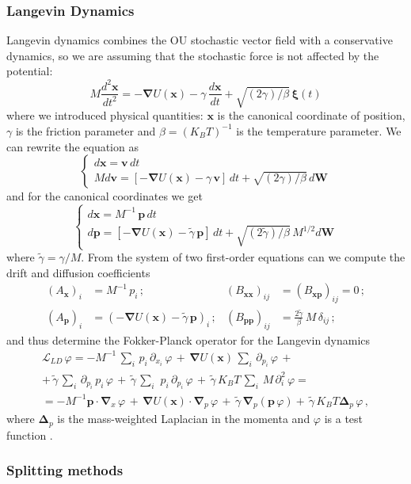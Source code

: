 \documentclass[10pt,a4paper]{article}
\begin{document}
\subsubsection{Langevin Dynamics}
Langevin dynamics combines the OU stochastic vector field with a conservative dynamics, so we are assuming that the stochastic force is not affected by the potential:
\[
 M\frac{d^2\mathbf{x}}{dt^2}=-\boldsymbol{\nabla} U(\mathbf{x})-\gamma\,\frac{d\mathbf{x}}{dt}+\sqrt{(2\gamma)/\beta}\,\boldsymbol{\xi}(t)
\]
where we introduced physical quantities: $\mathbf{x}$ is the canonical coordinate of position, $\gamma$ is the friction parameter and $\beta=\left( K_BT \right)^{-1}$ is the temperature parameter. We can rewrite the equation as
\[
\begin{cases}
 d\mathbf{x}=\mathbf{v}\,dt \\
 Md\mathbf{v}=\left[ -\boldsymbol{\nabla} U(\mathbf{x})-\gamma\,\mathbf{v} \right]\,dt+\sqrt{(2\gamma)/\beta}\,d\mathbf{W}
\end{cases}
\]
and for the canonical coordinates we get 
\[
\begin{cases}
 d\mathbf{x}=M^{-1}\,\mathbf{p}\,dt \\
 d\mathbf{p}=\left[ -\boldsymbol{\nabla} U(\mathbf{x})-\tilde{\gamma}\,\mathbf{p} \right]\,dt+\sqrt{(2\tilde{\gamma})/\beta}\,M^{1/2}d\mathbf{W}
\end{cases}
\]
where $\tilde{\gamma}=\gamma/M$. From the system of two first-order equations can we compute the drift and diffusion coefficients
\begin{align*}
 \left(A_{\mathbf{x}}\right)_i &= M^{-1}\,p_i\,;  &  \left(B_{\mathbf{x}\mathbf{x}}\right)_{ij} &= \left(B_{\mathbf{x}\mathbf{p}}\right)_{ij}=0\,; \\
 \left(A_{\mathbf{p}}\right)_i &= \left(-\boldsymbol{\nabla} U(\mathbf{x})-\tilde{\gamma}\,\mathbf{p}\right)_i\,;  &  
      \left(B_{\mathbf{p}\mathbf{p}}\right)_{ij} &= \frac{2\tilde{\gamma}}{\beta}\,M\,\delta_{ij}\,;
\end{align*}
and thus determine the Fokker-Planck operator for the Langevin dynamics
\begin{multline*}
 \mathscr{L}_{LD}\,\varphi=-M^{-1}\,\sum_i\,p_i\,\partial_{x_i}\,\varphi\,+ 
                          \,\boldsymbol{\nabla}U(\mathbf{x})\,\sum_i\,\partial_{p_i}\,\varphi\,+{}\\
                          +\,\tilde{\gamma}\,\sum_i\,\partial_{p_i}\,p_i\,\varphi\,+
                          \,\tilde{\gamma}\,\sum_i\,\,p_i\,\partial_{p_i}\,\varphi\,+
                          \,\tilde{\gamma}\,K_BT\,\sum_i\,M\,\partial_i^2\,\varphi={}\\
                          =-M^{-1}\mathbf{p}\cdot\boldsymbol{\nabla}_{x}\,\varphi\,+
                          \,\boldsymbol{\nabla}U(\mathbf{x})\cdot\boldsymbol{\nabla}_{p}\,\varphi\,+
                          \,\tilde{\gamma}\,\boldsymbol{\nabla}_{p}(\mathbf{p}\,\varphi)+
                          \,\tilde{\gamma}\,K_BT\boldsymbol{\Delta}_{p}\,\varphi\,,
\end{multline*}
where $\boldsymbol{\Delta}_{p}$ is the mass-weighted Laplacian in the momenta and $\varphi$ is a test function \cite{Risk:TheFPeq}.

\subsubsection{Splitting methods}


\cleardoublepage
{}
{}


\end{document}
